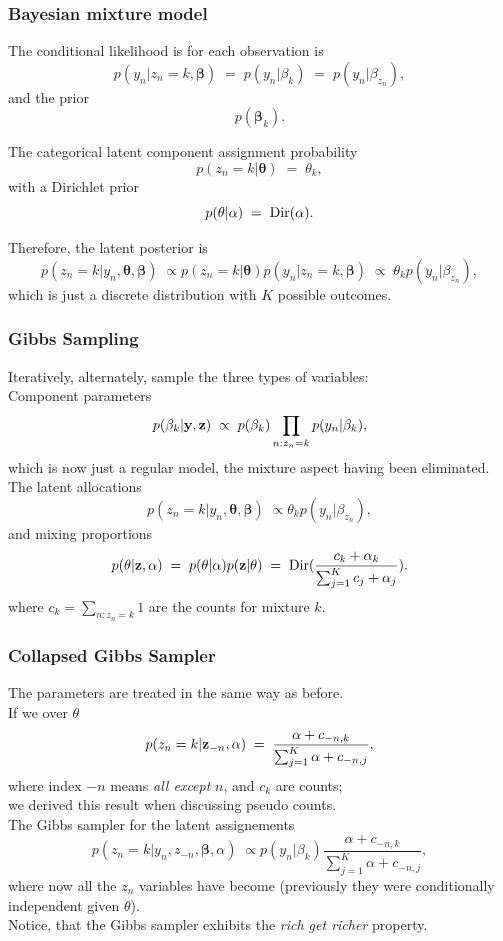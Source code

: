 \begin{frame}
\frametitle{Bayesian mixture model}

The conditional likelihood is for each observation is
\[
p(y_n|z_n=k,\boldsymbol\beta)\;=\;p(y_n|\beta_k)\;=\;p(y_n|\beta_{z_n}),
\]
and the prior
\[
p(\boldsymbol\beta_k).
\]

The categorical latent component assignment probability
\[
p(z_n=k|\boldsymbol\theta)\;=\;\theta_k,
\]
with a Dirichlet prior
\[
p(\theta|\alpha)\;=\;{\rm Dir}(\alpha).
\]

Therefore, the latent posterior is
\[
p(z_n=k|y_n,\boldsymbol\theta,\boldsymbol\beta)\;\propto
p(z_n=k|\boldsymbol\theta)p(y_n|z_n=k,\boldsymbol\beta)\;\propto\;
\theta_k p(y_n|\beta_{z_n}),
\]
which is just a discrete distribution with $K$ possible outcomes.
\end{frame}


\begin{frame}
\frametitle{Gibbs Sampling}

Iteratively, alternately, sample the three types of variables:\\[1ex]

Component parameters
\[
p(\beta_k|{\bf y},{\bf z})\;\propto\;p(\beta_k)\prod_{n:z_n=k}p(y_n|\beta_k),
\]
which is now just a regular model, the mixture aspect having been eliminated.\\[1ex]

The latent allocations
\[
p(z_n=k|y_n,\boldsymbol\theta,\boldsymbol\beta)\;\propto \theta_k
p(y_n|\beta_{z_n}),
\]
and mixing proportions
\[
p(\theta|{\bf z},\alpha)\;=\;p(\theta|\alpha)p({\bf z}|\theta)\;=\;
{\rm Dir}(\frac{c_k+\alpha_k}{\sum_{j=1}^K c_j+\alpha_j}).
\]
where $c_k=\sum_{n:z_n=k}1$ are the counts for mixture $k$.
\end{frame}

\begin{frame}
\frametitle{Collapsed Gibbs Sampler}

The parameters are treated in the same way as before.\\[1ex]

If we  over $\theta$
\[
p(z_n=k|{\bf z}_{-n},\alpha)\;=\;\frac{\alpha+c_{-n,k}}{\sum_{j=1}^K\alpha+c_{-n,j}},
\]
where index $-n$ means \emph{all except} $n$, and $c_k$ are counts;\\
we derived this result when discussing pseudo counts.\\[1ex]

The  Gibbs sampler for the latent assignements
\[
p(z_n=k|y_n,z_{-n},\boldsymbol\beta,\alpha)\;\propto
p(y_n|\beta_k)\frac{\alpha+c_{-n,k}}{\sum_{j=1}^K\alpha+c_{-n,j}},
\]
where now all the $z_n$ variables have become  (previously
they were conditionally independent given $\theta$).\\[1ex]

Notice, that the Gibbs sampler exhibits the \emph{rich get richer} property.
\end{frame}

